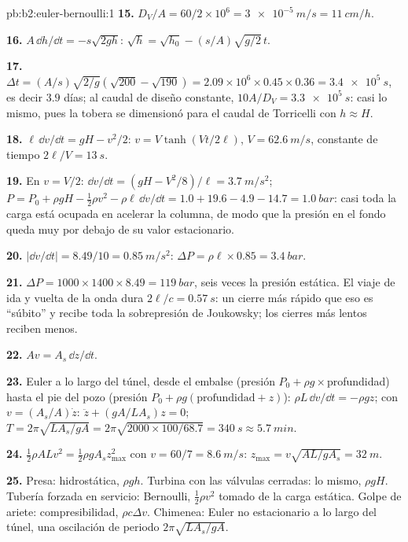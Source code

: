 \begin{solution}{pb:b2:euler-bernoulli:1}
\textbf{15.} $D_V/A = 60/2 \times 10^6 = \qty{3e-5}{m/s} = \qty{11}{cm/h}$.

\textbf{16.} $A\,\dd h/\dd t = -s\sqrt{2gh}$: $\sqrt h = \sqrt{h_0} - (s/A)\sqrt{g/2}\,t$.

\textbf{17.} $\Delta t = (A/s)\sqrt{2/g}(\sqrt{200} - \sqrt{190}) = 2.09 \times 10^6 \times
0.45 \times 0.36 = \qty{3.4e5}{s}$, es decir $3.9$ días; al caudal de diseño constante,
$10A/D_V = \qty{3.3e5}{s}$: casi lo mismo, pues la tobera se dimensionó
para el caudal de Torricelli con $h \approx H$.

\textbf{18.} $\ell\,\dd v/\dd t = gH - v^2/2$: $v = V\tanh(Vt/2\ell)$, $V = \qty{62.6}{m/s}$,
constante de tiempo $2\ell/V = \qty{13}{s}$.

\textbf{19.} En $v = V/2$: $\dd v/\dd t = (gH - V^2/8)/\ell = \qty{3.7}{m/s^2}$;
$P = P_0 + \rho gH - \tfrac12\rho v^2 - \rho\ell\,\dd v/\dd t = 1.0 + 19.6 - 4.9 - 14.7
= \qty{1.0}{bar}$: casi toda la carga está ocupada en acelerar la columna,
de modo que la presión en el fondo queda muy por debajo de su valor estacionario.

\textbf{20.} $|\dd v/\dd t| = 8.49/10 = \qty{0.85}{m/s^2}$: $\Delta P = \rho\ell \times 0.85 =
\qty{3.4}{bar}$.

\textbf{21.} $\Delta P = 1000 \times 1400 \times 8.49 = \qty{119}{bar}$, seis veces la
presión estática. El viaje de ida y vuelta de la onda dura $2\ell/c = \qty{0.57}{s}$:
un cierre más rápido que eso es ``súbito'' y recibe toda la sobrepresión
de Joukowsky; los cierres más lentos reciben menos.

\textbf{22.} $Av = A_s\,\dd z/\dd t$.

\textbf{23.} Euler a lo largo del túnel, desde el embalse (presión
$P_0 + \rho g\times$profundidad) hasta el pie del pozo (presión $P_0 + \rho g
(\text{profundidad} + z)$): $\rho L\,\dd v/\dd t = -\rho gz$; con $v = (A_s/A)\dot z$:
$\ddot z + (gA/LA_s)z = 0$; $T = 2\pi\sqrt{LA_s/gA} = 2\pi\sqrt{2000 \times 100/
68.7} = \qty{340}{s} \approx \qty{5.7}{min}$.

\textbf{24.} $\tfrac12\rho ALv^2 = \tfrac12\rho gA_sz_{\max}^2$ con $v = 60/7 =
\qty{8.6}{m/s}$: $z_{\max} = v\sqrt{AL/gA_s} = \qty{32}{m}$.

\textbf{25.} Presa: hidrostática, $\rho gh$. Turbina con las válvulas
cerradas: lo mismo, $\rho gH$. Tubería forzada en servicio: Bernoulli,
$\tfrac12\rho v^2$ tomado de la carga estática. Golpe de ariete:
compresibilidad, $\rho c\Delta v$. Chimenea: Euler no estacionario a lo
largo del túnel, una oscilación de periodo $2\pi\sqrt{LA_s/gA}$.
\end{solution}
